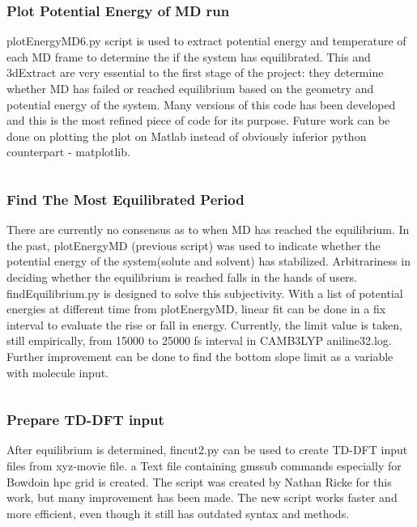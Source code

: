 \documentclass[
journal=jpcbfk, %
manuscript=article]{achemso}
\begin{document}
		\subsubsection{Plot Potential Energy of MD run}
			plotEnergyMD6.py script is used to extract potential energy and temperature of each MD frame to determine the if the system has equilibrated. This and 3dExtract are very essential to the first stage of the project: they determine whether MD has failed or reached equilibrium based on the geometry and potential energy of the system. Many versions of this code has been developed and this is the most refined piece of code for its purpose. Future work can be done on plotting the plot on Matlab instead of obviously inferior python counterpart - matplotlib. 
			\inputminted[linenos, breaklines, baselinestretch=1, fontsize=\small]{python}{../pythonScripts/plotEnergyMD6.py} 	
		
		\subsubsection{Find The Most Equilibrated Period}
			There are currently no consensus as to when MD has reached the equilibrium. In the past, plotEnergyMD (previous script) was used to indicate whether the potential energy of the system(solute and solvent) has stabilized. Arbitrariness in deciding whether the equilibrium is reached falls in the hands of users. findEquilibrium.py is designed to solve this subjectivity. With a list of potential energies at different time from plotEnergyMD, linear fit can be done in a fix interval to evaluate the rise or fall in energy. Currently, the limit value is taken, still empirically, from 15000 to 25000 fs interval in CAMB3LYP aniline32.log. Further improvement can be done to find the bottom slope limit as a variable with molecule input.
			\inputminted[linenos, breaklines, baselinestretch=1, fontsize=\small]{python}{../pythonScripts/findEquilibrium.py} 
		
		\subsubsection{Prepare TD-DFT input}
			After equilibrium is determined, fincut2.py can be used to create TD-DFT input files from xyz-movie file. a Text file containing gmssub commands especially for Bowdoin hpc grid is created. The script was created by Nathan Ricke for this work, but many improvement has been made. The new script works faster and more efficient, even though it still has outdated syntax and methods.
			\inputminted[linenos, breaklines, baselinestretch=1, fontsize=\small]{python}{../pythonScripts/fincut2.py} 
		
\end{document}
